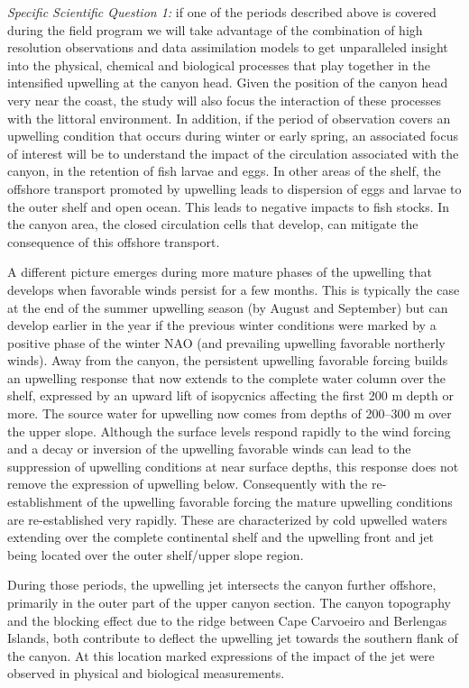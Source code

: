 \begin{description}
  \textsl{Specific Scientific Question 1:} if one of the periods
  described above is covered during the \proj field program we will
  take advantage of the combination of high resolution observations
  and data assimilation models to get unparalleled insight into the
  physical, chemical and biological processes that play together in
  the intensified upwelling at the \naz canyon head. Given the
  position of the canyon head very near the coast, the study will also
  focus the interaction of these processes with the littoral
  environment. In addition, if the period of observation covers an
  upwelling condition that occurs during winter or early
  spring, an associated focus of interest will be to understand the
  impact of the circulation associated with the canyon, in the
  retention of fish larvae and eggs. In other areas of the shelf, the
  offshore transport promoted by upwelling leads to dispersion of
  eggs and larvae to the outer shelf and open ocean. This leads to
  negative impacts to fish stocks. In the canyon area, the closed
  circulation cells that develop, can mitigate the consequence of this
  offshore transport.

 
A different picture emerges during more mature phases of the upwelling
that develops when favorable winds persist for a few months. This is
typically the case at the end of the summer upwelling season (by
August and September) but can develop earlier in the year if the
previous winter conditions were marked by a positive phase of the
winter NAO (and prevailing upwelling favorable northerly winds). Away
from the canyon, the persistent upwelling favorable forcing builds an
upwelling response that now extends to the complete water column over
the shelf, expressed by an upward lift of isopycnics affecting the
first 200 m depth or more. The source water for upwelling now comes
from depths of 200--300 m over the upper slope. Although the surface
levels respond rapidly to the wind forcing and a decay or inversion of
the upwelling favorable winds can lead to the suppression of upwelling
conditions at near surface depths, this response does not remove the
expression of upwelling below. Consequently with the re-establishment
of the upwelling favorable forcing the mature upwelling conditions are
re-established very rapidly. These are characterized by cold upwelled
waters extending over the complete continental shelf and the upwelling
front and jet being located over the outer shelf/upper slope region.

During those periods, the upwelling jet intersects the \naz canyon
further offshore, primarily in the outer part of the upper canyon
section. The canyon topography and the blocking effect due to the
ridge between Cape Carvoeiro and Berlengas Islands, both contribute to
deflect the upwelling jet towards the southern flank of the canyon. At
this location marked expressions of the impact of the jet were
observed in physical and biological measurements.


\end{description}
